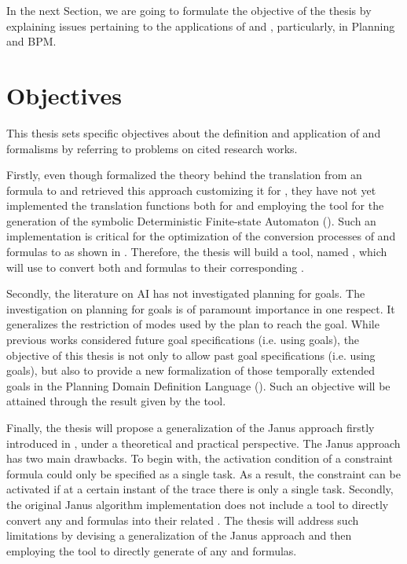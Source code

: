 In the next Section, we are going to formulate the objective of the thesis by explaining issues pertaining to the applications of \LTLf and \PLTL, particularly, in Planning and BPM.
\section{Objectives}
This thesis sets specific objectives about the definition and application of \LTLf and \PLTL formalisms by referring to problems on cited research works.

Firstly, even though \cite{de2013linear} formalized the theory behind the translation from an \LTLf formula to \FOL and \cite{zpv2018} retrieved this approach customizing it for \MONA, they have not yet implemented the translation functions both for \LTLf and \PLTL employing the \MONA tool for the generation of the symbolic Deterministic Finite-state Automaton (\DFA). Such an implementation is critical for the optimization of the conversion processes of \LTLf and \PLTL formulas to \DFA as shown in \cite{zhu2017symbolic}. Therefore, the thesis will build a tool, named \LTLfToDFA, which will use \MONA to convert both \LTLf and \PLTL formulas to their corresponding \DFA.

Secondly, the literature on AI has not investigated planning for \PLTL goals. The investigation on planning for \PLTL goals is of paramount importance in one respect. It generalizes the restriction of modes used by the plan to reach the goal. While previous works considered future goal specifications (i.e. using \LTLf goals), the objective of this thesis is not only to allow past goal specifications (i.e. using \PLTL goals), but also to provide a new formalization of those temporally extended goals in the Planning Domain Definition Language (\PDDL). Such an objective will be attained through the result given by the \LTLfToDFA tool.

Finally, the thesis will propose a generalization of the Janus approach firstly introduced in \cite{cecconi2018interestingness}, under a theoretical and practical perspective. The Janus approach has two main drawbacks. To begin with, the activation condition of a constraint formula could only be specified as a single task. As a result, the constraint can be activated if at a certain instant of the trace there is only a single task. Secondly, the original Janus algorithm implementation does not include a tool to directly convert any \LTLf and \PLTL formulas into their related \DFA. The thesis will address such limitations by devising a generalization of the Janus approach and then employing the \LTLfToDFA tool to directly generate \DFA of any \LTLf and \PLTL formulas.

